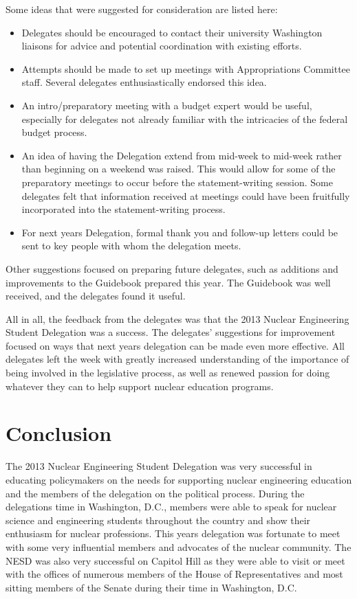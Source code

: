 \documentclass[12pt]{article}
\begin{document}
Some ideas that were suggested for consideration are listed here:
\begin{itemize}
\item Delegates should be encouraged to contact their university Washington
  liaisons for advice and potential coordination with existing efforts.
\item Attempts should be made to set up meetings with Appropriations Committee
  staff.  Several delegates enthusiastically endorsed this idea.
\item An intro/preparatory meeting with a budget expert would be useful,
  especially for delegates not already familiar with the intricacies of the
  federal budget process.
\item An idea of having the Delegation extend from mid-week to mid-week rather
  than beginning on a weekend was raised.  This would allow for some of the
  preparatory meetings to occur before the statement-writing session.  Some
  delegates felt that information received at meetings could have been
  fruitfully incorporated into the statement-writing process.
\item For next years Delegation, formal thank you and follow-up letters could be
  sent to key people with whom the delegation meets.
\end{itemize}

Other suggestions focused on preparing future delegates, such as additions and
improvements to the Guidebook prepared this year.  The Guidebook was well
received, and the delegates found it useful.

All in all, the feedback from the delegates was that the 2013 Nuclear
Engineering Student Delegation was a success.  The delegates’ suggestions for
improvement focused on ways that next years delegation can be made even more
effective.  All delegates left the week with greatly increased understanding of
the importance of being involved in the legislative process, as well as renewed
passion for doing whatever they can to help support nuclear education programs.

\newpage
\section{Conclusion}

The 2013 Nuclear Engineering Student Delegation was very successful in educating
policymakers on the needs for supporting nuclear engineering education and the
members of the delegation on the political process. During the delegations time
in Washington, D.C., members were able to speak for nuclear science and
engineering students throughout the country and show their enthusiasm for
nuclear professions. This years delegation was fortunate to meet with some very
influential members and advocates of the nuclear community. The NESD was also
very successful on Capitol Hill as they were able to visit or meet with the
offices of numerous members of the House of Representatives and most sitting
members of the Senate during their time in Washington, D.C.
\end{document}
